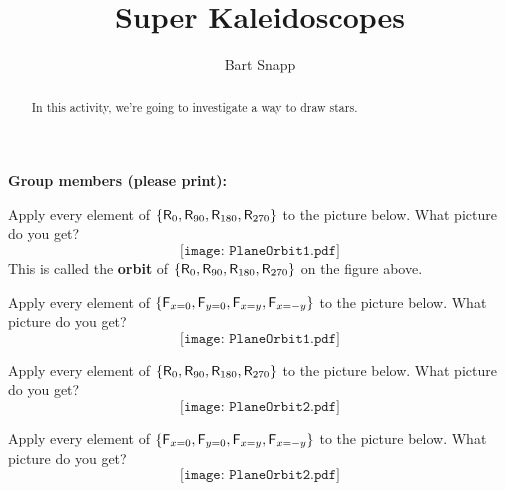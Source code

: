 \documentclass[handout,nooutcomes,noauthor]{ximera}
\title{Super Kaleidoscopes}
\author{Bart Snapp}
\begin{document}
\begin{abstract}
  In this activity, we're going to investigate a way to draw stars.
\end{abstract}
\maketitle

\noindent\textbf{Group members (please print):}\ \hrulefill \\

\hrulefill


\begin{problem}
Apply every element of
$\{\mathsf{R}_{0},\mathsf{R}_{90},\mathsf{R}_{180},\mathsf{R}_{270}\}$ to the
picture below. What picture do you get?
\[
\texttt{[image: PlaneOrbit1.pdf]}
\]
This is called the \textbf{orbit} of
$\{\mathsf{R}_{0},\mathsf{R}_{90},\mathsf{R}_{180},\mathsf{R}_{270}\}$ on the
figure above.
\end{problem}

\vfill

\break

\begin{problem}
Apply every element of $\{\mathsf{F}_{x=0}, \mathsf{F}_{y=0}, \mathsf{F}_{x=y},\mathsf{F}_{x=-y}\}$ to the picture below. What picture do
you get?
\[
\texttt{[image: PlaneOrbit1.pdf]}
\]
\end{problem}

\vfill

\break

\begin{problem}
Apply every element of $\{\mathsf{R}_{0},\mathsf{R}_{90},\mathsf{R}_{180},\mathsf{R}_{270}\}$ to the picture below. What picture do
you get?
\[
\texttt{[image: PlaneOrbit2.pdf]}
\]
\end{problem}

\vfill

\break

\begin{problem}
Apply every element of
$\{\mathsf{F}_{x=0}, \mathsf{F}_{y=0}, \mathsf{F}_{x=y},\mathsf{F}_{x=-y}\}$ to
the picture below. What picture do you get?
\[
\texttt{[image: PlaneOrbit2.pdf]}
\]
\end{problem}

\vfill
\end{document}
